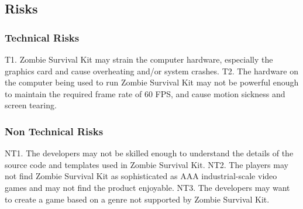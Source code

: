 \documentclass[12pt, titlepage]{article}
\begin{document}




\subsection{Risks}

\subsubsection{Technical Risks}
{\color{magenta} T1.} Zombie Survival Kit may strain the computer hardware, especially the graphics card and cause overheating and/or system crashes.
\newline
{\color{magenta} T2.} The hardware on the computer being used to run Zombie Survival Kit may not be powerful enough to maintain the required frame rate of 60 FPS, and cause motion sickness and screen tearing.

\subsubsection{Non Technical Risks}
{\color{magenta} NT1.} The developers may not be skilled enough to understand the details of the source code and templates used in Zombie Survival Kit.
\newline
{\color{magenta} NT2.} The players may not find Zombie Survival Kit as sophisticated as AAA industrial-scale video games and may not find the product enjoyable.
\newline
{\color{magenta} NT3.} The developers may want to create a game based on a genre not supported by Zombie Survival Kit.

\end{document}
